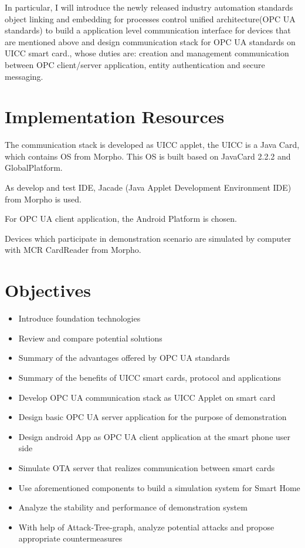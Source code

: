 \documentclass[]{llncs}
\begin{document}
In particular, I will introduce the newly released industry automation standards object linking and embedding for processes control unified architecture(OPC UA standards) to build a application level communication interface for devices that are mentioned above and design communication stack for OPC UA standards on UICC smart card., whose  duties are: creation and management communication between OPC client/server application, entity authentication and secure messaging.


\section{Implementation Resources}
The communication stack  is developed as UICC applet, the UICC is a Java Card, which contains OS from Morpho. This OS is built based on JavaCard 2.2.2 and GlobalPlatform.

\noindent As develop and test IDE, Jacade (Java Applet Development Environment IDE) from Morpho is used.

\noindent For OPC UA client application, the Android Platform is chosen.

\noindent Devices which participate in demonstration scenario  are simulated by computer with MCR CardReader from Morpho.

\section{Objectives}
\begin{itemize}
\item Introduce foundation technologies
\item Review and compare potential solutions
\item Summary of the advantages offered by OPC UA standards
\item Summary of the benefits of UICC smart cards, protocol and applications
\item Develop OPC UA communication stack as UICC Applet on smart card 
\item Design  basic OPC UA server application for the purpose of demonstration 
\item Design android App as OPC UA client application at the smart phone user side
\item Simulate OTA server that realizes communication between smart cards
\item Use aforementioned components to build a simulation system for Smart Home
\item Analyze the stability and performance of demonstration system
\item With help of Attack-Tree-graph, analyze potential attacks and propose appropriate countermeasures

\end{itemize}
 
\end{document}
